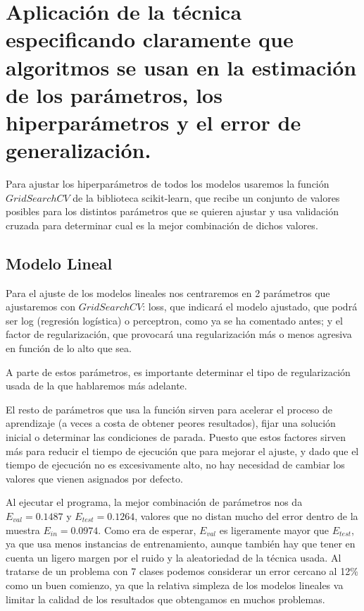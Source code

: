 \documentclass{article}
\begin{document}
	\section{Aplicación de la técnica especificando claramente que algoritmos se usan en la estimación de los parámetros, los hiperparámetros y el error de generalización.} %
	Para ajustar los hiperparámetros de todos los modelos usaremos la función $GridSearchCV$ de la biblioteca scikit-learn, que recibe un conjunto de valores posibles para los distintos parámetros que se quieren ajustar y usa validación cruzada para determinar cual es la mejor combinación de dichos valores.
	\subsection{Modelo Lineal}
	Para el ajuste de los modelos lineales nos centraremos en 2 parámetros que ajustaremos con $GridSearchCV$: loss, que indicará el modelo ajustado, que podrá ser log (regresión logística) o perceptron, como ya se ha comentado antes; y el factor de regularización, que provocará una regularización más o menos agresiva en función de lo alto que sea.
	\par 
	A parte de estos parámetros, es importante determinar el tipo de regularización usada de la que hablaremos más adelante.
	\par 
	El resto de parámetros que usa la función sirven para acelerar el proceso de aprendizaje (a veces a costa de obtener peores resultados), fijar una solución inicial o determinar las condiciones de parada. Puesto que estos factores sirven más para reducir el tiempo de ejecución que para mejorar el ajuste, y dado que el tiempo de ejecución no es excesivamente alto, no hay necesidad de cambiar los valores que vienen asignados por defecto.
	\par 
	Al ejecutar el programa, la mejor combinación de parámetros nos da  $E_{val} = 0.1487$ y $E_{test} = 0.1264$, valores que no distan mucho del error dentro de la muestra $E_{in} = 0.0974$. Como era de esperar, $E_{val}$ es ligeramente mayor que $E_{test}$, ya que usa menos instancias de entrenamiento, aunque también hay que tener en cuenta un ligero margen por el ruido y la aleatoriedad de la técnica usada. Al tratarse de un problema con 7 clases podemos considerar un error cercano al 12\% como un buen comienzo, ya que la relativa simpleza de los modelos lineales va limitar la calidad de los resultados que obtengamos en muchos problemas.
\end{document}
